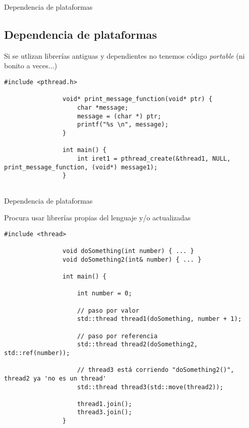 \documentclass{beamer}
\newcommand{\normalSizeItem}[1] {
  \normalsize{\item #1}
}
\newcommand{\smallCite}[1]{
	\begin{small}
		\cite{#1}	
	\end{small}
}
\begin{document}
		\begin{frame}[fragile]{Dependencia de plataformas}	
			\subsection{Dependencia de plataformas}		
			\begin{itemize}
				\normalSizeItem { Si se utlizan librerías antiguas y dependientes no tenemos código \textit{portable} (ni bonito a veces...) \smallCite{posixThreads}}
						\begin{lstlisting}[basicstyle={\tiny\ttfamily}]
				#include <pthread.h>

				void* print_message_function(void* ptr) {
					char *message;
					message = (char *) ptr;
					printf("%s \n", message);
				}
				
				int main() {
					int iret1 = pthread_create(&thread1, NULL, print_message_function, (void*) message1);
				}
		
						\end{lstlisting}
			\end{itemize}
		\end{frame}
		
		\begin{frame}[fragile]{Dependencia de plataformas}	
			\begin{itemize}

				\normalSizeItem { Procura usar librerías propias del lenguaje y/o actualizadas }
				\begin{lstlisting}[basicstyle={\tiny\ttfamily}]
				#include <thread>
				
				void doSomething(int number) { ... }
				void doSomething2(int& number) { ... }
				
				int main() {
				
					int number = 0;
					
					// paso por valor
					std::thread thread1(doSomething, number + 1); 
					
					// paso por referencia
					std::thread thread2(doSomething2, std::ref(number)); 
					
					// thread3 está corriendo "doSomething2()", thread2 ya 'no es un thread'
					std::thread thread3(std::move(thread2)); 
					
					thread1.join();
					thread3.join();					
				}
				
				\end{lstlisting}
				
			\end{itemize}
		\end{frame}
		
\end{document}
